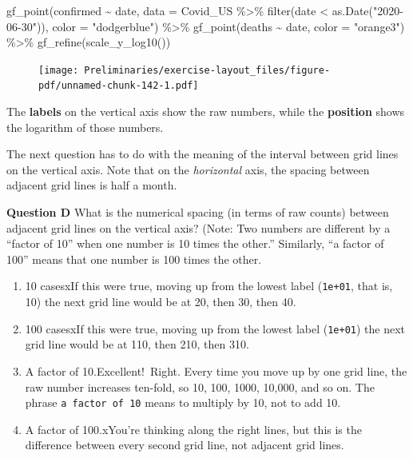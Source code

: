 \documentclass[
  letterpaper,
  DIV=11,
  numbers=noendperiod,
  oneside]{article}
\newenvironment{Shaded}{\begin{snugshade}}{\end{snugshade}}
\newcommand{\AttributeTok}[1]{\textcolor[rgb]{0.40,0.45,0.13}{#1}}
\newcommand{\FunctionTok}[1]{\textcolor[rgb]{0.28,0.35,0.67}{#1}}
\newcommand{\NormalTok}[1]{\textcolor[rgb]{0.00,0.23,0.31}{#1}}
\newcommand{\SpecialCharTok}[1]{\textcolor[rgb]{0.37,0.37,0.37}{#1}}
\newcommand{\StringTok}[1]{\textcolor[rgb]{0.13,0.47,0.30}{#1}}
\providecommand{\tightlist}{%
  \setlength{\itemsep}{0pt}\setlength{\parskip}{0pt}}\usepackage{longtable,booktabs,array}
\begin{document}
\begin{multicols}{2}
\begin{Shaded}
\begin{Highlighting}[]
\FunctionTok{gf\_point}\NormalTok{(confirmed }\SpecialCharTok{\textasciitilde{}}\NormalTok{ date, }
         \AttributeTok{data =}\NormalTok{ Covid\_US }\SpecialCharTok{\%\textgreater{}\%} \FunctionTok{filter}\NormalTok{(date }\SpecialCharTok{\textless{}} \FunctionTok{as.Date}\NormalTok{(}\StringTok{"2020{-}06{-}30"}\NormalTok{)), }
         \AttributeTok{color =} \StringTok{"dodgerblue"}\NormalTok{) }\SpecialCharTok{\%\textgreater{}\%}
  \FunctionTok{gf\_point}\NormalTok{(deaths }\SpecialCharTok{\textasciitilde{}}\NormalTok{ date, }\AttributeTok{color =} \StringTok{"orange3"}\NormalTok{) }\SpecialCharTok{\%\textgreater{}\%}
  \FunctionTok{gf\_refine}\NormalTok{(}\FunctionTok{scale\_y\_log10}\NormalTok{())}
\end{Highlighting}
\end{Shaded}

\begin{figure}[H]

{\centering \texttt{[image: Preliminaries/exercise-layout\_files/figure-pdf/unnamed-chunk-142-1.pdf]}

}

\end{figure}

The \textbf{labels} on the vertical axis show the raw numbers, while the
\textbf{position} shows the logarithm of those numbers.

The next question has to do with the meaning of the interval between
grid lines on the vertical axis. Note that on the \emph{horizontal}
axis, the spacing between adjacent grid lines is half a month.

\textbf{Question D} What is the numerical spacing (in terms of raw
counts) between adjacent grid lines on the vertical axis? (Note: Two
numbers are different by a ``factor of 10'' when one number is 10 times
the other.'' Similarly, ``a factor of 100'' means that one number is 100
times the other.

\begin{enumerate}
\def\labelenumi{\roman{enumi}.}
\tightlist
\item
  {10 cases{xIf this were true, moving up from the lowest label
  (\texttt{1e+01}, that is, 10) the next grid line would be at 20, then
  30, then 40.}}\\
\item
  {100 cases{xIf this were true, moving up from the lowest label
  (\texttt{1e+01}) the next grid line would be at 110, then 210, then
  310.}}\\
\item
  {A factor of 10.{Excellent!~Right. Every time you move up by one grid
  line, the raw number increases ten-fold, so 10, 100, 1000, 10,000, and
  so on. The phrase \texttt{a\ factor\ of\ 10} means to multiply by 10,
  not to add 10.}}\\
\item
  {A factor of 100.{xYou're thinking along the right lines, but this
  is the difference between every second grid line, not adjacent grid
  lines.}}
\end{enumerate}


\end{multicols}
\end{document}
